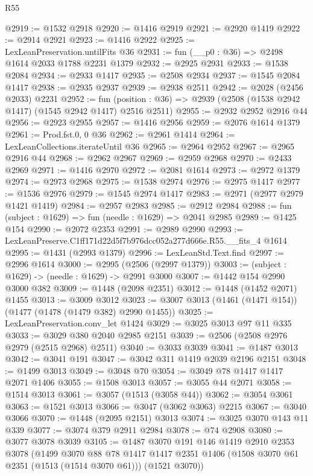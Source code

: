 \begin{lexlean}{R55}
\begin{coremodule}
{{@2919 := @1532 @2918
@2920 := @1416 @2919
@2921 := @2920 @1419
@2922 := @2914 @2921
@2923 := @1416 @2922
@2925 := LexLeanPreservation.untilFits @36
@2931 := fun (__p0 : @36) => @2498 @1614 @2033 @1788 @2231 @1379
@2932 := @2925 @2931
@2933 := @1538 @2084
@2934 := @2933 @1417
@2935 := @2508 @2934
@2937 := @1545 @2084 @1417
@2938 := @2935 @2937
@2939 := @2938 @2511
@2942 := @2028 (@2456 @2033) @2231
@2952 := fun (position : @36) => @2939 (@2508 (@1538 @2942 @1417) (@1545 @2942 @1417) @2516 @2511)
@2955 := @2932 @2952 @2916 @44
@2956 := @2923 @2955
@2957 := @1416 @2956
@2959 := @2076 @1614 @1379
@2961 := Prod.fst.{0, 0} @36
@2962 := @2961 @1414
@2964 := LexLeanCollections.iterateUntil @36
@2965 := @2964 @2952
@2967 := @2965 @2916 @44
@2968 := @2962 @2967
@2969 := @2959 @2968
@2970 := @2433 @2969
@2971 := @1416 @2970
@2972 := @2081 @1614
@2973 := @2972 @1379
@2974 := @2973 @2968
@2975 := @1538 @2974
@2976 := @2975 @1417
@2977 := @1536 @2976
@2979 := @1545 @2974 @1417
@2983 := @2971 (@2977 @2979 @1421 @1419)
@2984 := @2957 @2983
@2985 := @2912 @2984
@2988 := fun (subject : @1629) => fun (needle : @1629) => @2041 @2985
@2989 := @1425 @154
@2990 := @2072 @2353
@2991 := @2989 @2990
@2993 := LexLeanPreserve.C1ff171d22d5f7b976dcc052a277d666e.R55.__fits_4 @1614
@2995 := @1431 (@2993 @1379)
@2996 := LexLeanStd.Text.find
@2997 := @2996 @1614
@3000 := @2995 (@2506 (@2997 @1379))
@3003 := (subject : @1629) -> (needle : @1629) -> @2991 @3000
@3007 := @1442 @154 @2990 @3000 @382
@3009 := @1448 (@2098 @2351)
@3012 := @1448 (@1452 @2071) @1455
@3013 := @3009 @3012
@3023 := @3007 @3013 (@1461 (@1471 @154)) (@1477 (@1478 (@1479 @382) @2990 @1455))
@3025 := LexLeanPreservation.conv_let @1424
@3029 := @3025 @3013 @97 @11 @335
@3033 := @3029 @380 @2040 @2985 @2151
@3039 := @2506 (@2508 @2976 @2979 (@2515 @2968) @2511)
@3040 := @3033 @3039
@3041 := @1487 @3013
@3042 := @3041 @191
@3047 := @3042 @311 @1419 @2039 @2196 @2151
@3048 := @1499 @3013
@3049 := @3048 @70
@3054 := @3049 @78 @1417 @1417 @2071 @1406
@3055 := @1508 @3013
@3057 := @3055 @44 @2071
@3058 := @1514 @3013
@3061 := @3057 (@1513 (@3058 @44))
@3062 := @3054 @3061
@3063 := @1521 @3013
@3066 := @3047 (@3062 @3063) @2215
@3067 := @3040 @3066
@3070 := @1448 (@2095 @2151) @3013
@3074 := @3025 @3070 @143 @11 @339
@3077 := @3074 @379 @2911 @2984
@3078 := @74 @2908
@3080 := @3077 @3078 @3039
@3105 := @1487
    @3070
    @191
    @146
    @1419
    @2910
    @2353
    @3078
    (@1499
      @3070
      @88
      @78
      @1417
      @1417
      @2351
      @1406
      (@1508 @3070 @61 @2351 (@1513 (@1514 @3070 @61)))
      (@1521 @3070))
}}
\end{coremodule}
\end{lexlean}
